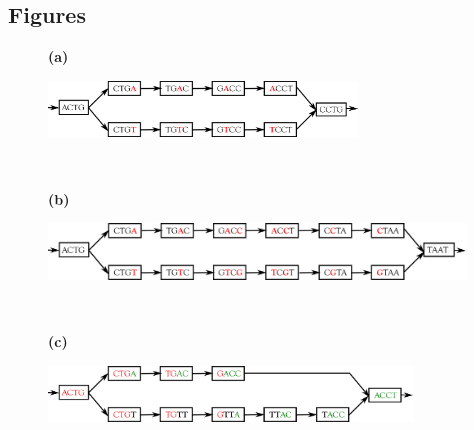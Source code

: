 \documentclass{bmcart}
\begin{document}
\begin{backmatter}




\section*{Figures}

\begin{figure}[h!]  
\begin{minipage}[c]{0.05\textwidth}
\textbf{(a)}
\end{minipage}
\begin{minipage}[c]{0.90\textwidth}
\includegraphics[height=1.5cm]{figures/bubble_snp.png}
\end{minipage}\\

\begin{minipage}[c]{0.05\textwidth}
\textbf{(b)}
\end{minipage}
\begin{minipage}[c]{0.9\textwidth}
\includegraphics[height=1.5cm]{figures/bubble_close_snp.png}
\end{minipage}\\


\begin{minipage}[c]{0.05\textwidth}
\textbf{(c)}
\end{minipage}
\begin{minipage}[c]{0.9\textwidth}
\includegraphics[height=1.5cm]{figures/bubble_indel.png}
\end{minipage}\\


\end{figure}
\end{backmatter}
\end{document}
